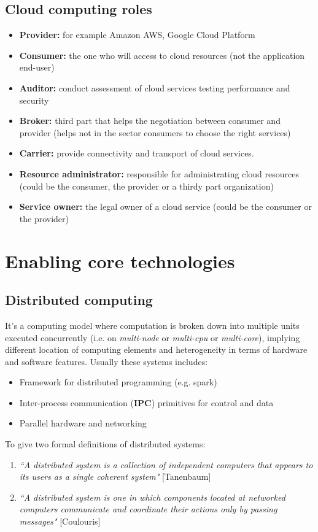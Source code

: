 \documentclass{article}
\begin{document}
\subsection{Cloud computing roles}
\begin{itemize}
    \item \textbf{Provider:} for example Amazon AWS, Google Cloud Platform
    \item \textbf{Consumer:} the one who will access to cloud resources (not the application end-user)
    \item \textbf{Auditor:} conduct assessment of cloud services testing performance and security
    \item \textbf{Broker:} third part that helps the negotiation between consumer and provider (helps not in the sector consumers to choose the right services)
    \item \textbf{Carrier:} provide connectivity and transport of cloud services.
    \item \textbf{Resource administrator:} responsible for administrating cloud resources (could be the consumer, the provider or a thirdy part organization)
    \item \textbf{Service owner:} the legal owner of a cloud service (could be the consumer or the provider)
\end{itemize}

\section{Enabling core technologies}
\subsection{Distributed computing}
It's a computing model where computation is broken down into multiple units executed concurrently (i.e. on \textit{multi-node} or \textit{multi-cpu} or \textit{multi-core}), implying different location of computing elements and heterogeneity in terms of hardware and software features. Usually these systems includes:
\begin{itemize}
    \item Framework for distributed programming (e.g. spark)
    \item Inter-process communication (\textbf{IPC}) primitives for control and data
    \item Parallel hardware and networking
\end{itemize}

To give two formal definitions of distributed systems:
\begin{enumerate}
    \item \textit{``A distributed system is a collection of independent computers that
appears to its users as a single coherent system"} [Tanenbaum]
    \item \textit{``A distributed system is one in which components located at networked
    computers communicate and coordinate their actions only by passing
    messages"} [Coulouris]
\end{enumerate}
\end{document}
